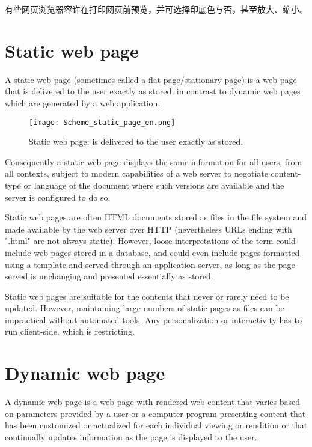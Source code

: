 有些网页浏览器容许在打印网页前预览，并可选择印底色与否，甚至放大、缩小。


\chapter{Static web page}


A static web page\cite{static_web_page} (sometimes called a flat page/stationary page) is a web page that is delivered to the user exactly as stored, in contrast to dynamic web pages which are generated by a web application.

\begin{figure}[!h]
\centering
\texttt{[image: Scheme\_static\_page\_en.png]}
\caption{Static web page: is delivered to the user exactly as stored.}
\label{Scheme_static_page_en}
\end{figure}


Consequently a static web page displays the same information for all users, from all contexts, subject to modern capabilities of a web server to negotiate content-type or language of the document where such versions are available and the server is configured to do so.

Static web pages are often HTML documents stored as files in the file system and made available by the web server over HTTP (nevertheless URLs ending with ".html" are not always static). However, loose interpretations of the term could include web pages stored in a database, and could even include pages formatted using a template and served through an application server, as long as the page served is unchanging and presented essentially as stored.

Static web pages are suitable for the contents that never or rarely need to be updated. However, maintaining large numbers of static pages as files can be impractical without automated tools. Any personalization or interactivity has to run client-side, which is restricting.







\chapter{Dynamic web page}




A dynamic web page\cite{dynamic_web_page} is a web page with rendered web content that varies based on parameters provided by a user or a computer program presenting content that has been customized or actualized for each individual viewing or rendition or that continually updates information as the page is displayed to the user.

